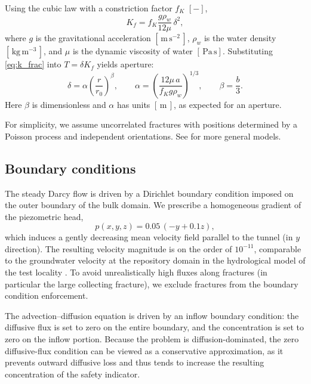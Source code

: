 \begin{enumerate}
Using the cubic law with a constriction factor $f_K$ $[-]$,
\begin{equation}
    \label{eq:k_frac}
    K_f = f_K \frac{g \rho_w}{12\mu}\,\delta^{2},
\end{equation}
where $g$ is the gravitational acceleration $[\,\mathrm{m\,s^{-2}}\,]$,
$\rho_w$ is the water density $[\,\mathrm{kg\,m^{-3}}\,]$, and
$\mu$ is the dynamic viscosity of water $[\,\mathrm{Pa\,s}]$.
Substituting \eqref{eq:k_frac} into $T=\delta K_f$ yields
aperture:
\begin{equation}
    \label{eq:k_frac_1}
    \delta = \alpha \left(\frac{r}{r_0}\right)^{\beta},
    \qquad
    \alpha = \left(\frac{12\mu\,a}{f_K g \rho_w}\right)^{\!1/3},
    \qquad
    \beta = \frac{b}{3}.
\end{equation}
Here $\beta$ is dimensionless and $\alpha$ has units $[\,\mathrm{m}\,]$, as
expected for an aperture.

\end{enumerate}

For simplicity, we assume uncorrelated fractures with positions determined by a
Poisson process and independent orientations. See
\cite{Sahimi20110420, Liu2016} for more general models.

\subsection{Boundary conditions}
The steady Darcy flow is driven by a Dirichlet boundary condition imposed on
the outer boundary of the bulk domain. We prescribe a homogeneous gradient of
the piezometric head,
\[
p(x,y,z) = 0.05\,(-y + 0.1z),
\]
which induces a gently decreasing mean velocity field parallel to the tunnel
(in $y$  direction). The resulting velocity magnitude is on the order of
$10^{-11}$, comparable to the groundwater velocity at the repository domain in
the hydrological model of the test locality . To avoid
unrealistically high fluxes along fractures (in particular the large collecting
fracture), we exclude fractures from the boundary condition enforcement.

The advection--diffusion equation is driven by an inflow boundary condition: the
diffusive flux is set to zero on the entire boundary, and the concentration is
set to zero on the inflow portion. Because the problem is diffusion-dominated,
the zero diffusive-flux condition can be viewed as a conservative
approximation, as it prevents outward diffusive loss and thus tends to increase
the resulting concentration of the safety indicator.

